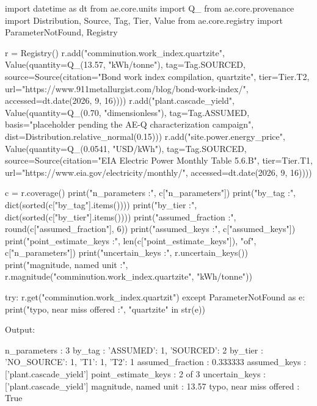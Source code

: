 \documentclass[10pt,a4paper,twoside]{report}
\begin{document}
\begin{doctestblock}
import datetime as dt
from ae.core.units import Q_
from ae.core.provenance import Distribution, Source, Tag, Tier, Value
from ae.core.registry import ParameterNotFound, Registry

r = Registry()
r.add("comminution.work_index.quartzite",
      Value(quantity=Q_(13.57, "kWh/tonne"), tag=Tag.SOURCED,
            source=Source(citation="Bond work index compilation, quartzite",
                          tier=Tier.T2, url="https://www.911metallurgist.com/blog/bond-work-index/",
                          accessed=dt.date(2026, 9, 16))))
r.add("plant.cascade_yield",
      Value(quantity=Q_(0.70, "dimensionless"), tag=Tag.ASSUMED,
            basis="placeholder pending the AE-Q characterization campaign",
            dist=Distribution.relative_normal(0.15)))
r.add("site.power.energy_price",
      Value(quantity=Q_(0.0541, "USD/kWh"), tag=Tag.SOURCED,
            source=Source(citation="EIA Electric Power Monthly Table 5.6.B", tier=Tier.T1,
                          url="https://www.eia.gov/electricity/monthly/",
                          accessed=dt.date(2026, 9, 16))))

c = r.coverage()
print("n_parameters            :", c["n_parameters"])
print("by_tag                  :", dict(sorted(c["by_tag"].items())))
print("by_tier                 :", dict(sorted(c["by_tier"].items())))
print("assumed_fraction        :", round(c["assumed_fraction"], 6))
print("assumed_keys            :", c["assumed_keys"])
print("point_estimate_keys     :", len(c["point_estimate_keys"]), "of", c["n_parameters"])
print("uncertain_keys          :", r.uncertain_keys())
print("magnitude, named unit   :", r.magnitude("comminution.work_index.quartzite", "kWh/tonne"))

try:
    r.get("comminution.work_index.quartzit")
except ParameterNotFound as e:
    print("typo, near miss offered :", "quartzite" in str(e))
\end{doctestblock}

{\footnotesize\color{slate}Output:\par}

\begin{outputblock}
n_parameters            : 3
by_tag                  : {'ASSUMED': 1, 'SOURCED': 2}
by_tier                 : {'NO_SOURCE': 1, 'T1': 1, 'T2': 1}
assumed_fraction        : 0.333333
assumed_keys            : ['plant.cascade_yield']
point_estimate_keys     : 2 of 3
uncertain_keys          : ['plant.cascade_yield']
magnitude, named unit   : 13.57
typo, near miss offered : True
\end{outputblock}
\end{document}
